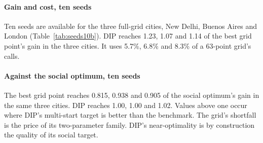 \documentclass[preprint,11pt]{elsarticle}
\theoremstyle{definition}
\theoremstyle{remark}
\begin{document}
\begin{table}[tbp]\centering\small
\caption{Leader methods, mean over seeds (exact oracle). DIP / grid: DIP gain over the best exact grid point's gain; calls: DIP's oracle calls as a percentage of a 63-point grid at the same calls per point. Gain shares against the social optimum (SO): best grid point, DIP, ARP flat; ARP / DIP gain ratio; $n_{\rm ARP}$ seeds with an ARP run. $^*$: reduced exact grid (lower bounds for the grid column). Shares are not reported where the optimum's gain is below 0.5\% of $|$social cost$|$.}\label{tab:seeds10b}
\end{table}

\paragraph{Gain and cost, ten seeds} Ten seeds are available for the three full-grid cities, New Delhi, Buenos Aires and London (Table~\ref{tab:seeds10b}). DIP reaches 1.23, 1.07 and 1.14 of the best grid point's gain in the three cities. It uses 5.7\%, 6.8\% and 8.3\% of a 63-point grid's calls.

\paragraph{Against the social optimum, ten seeds} The best grid point reaches 0.815, 0.938 and 0.905 of the social optimum's gain in the same three cities. DIP reaches 1.00, 1.00 and 1.02. Values above one occur where DIP's multi-start target is better than the benchmark. The grid's shortfall is the price of its two-parameter family. DIP's near-optimality is by construction the quality of its social target.
\end{document}
